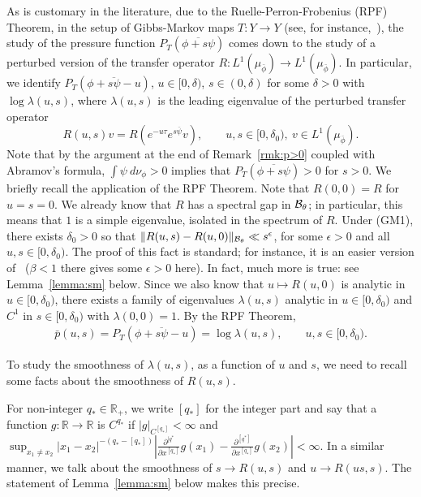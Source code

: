 \documentclass[12pt]{article}
\numberwithin{equation}{section}
\newcommand{\eps}{{\epsilon}}
\newcommand{\R}{\mathbb{R}}
\begin{document}
As is customary in the literature, due to the Ruelle-Perron-Frobenius (RPF) Theorem, in the setup of Gibbs-Markov maps $T:Y\to Y$ (see, for instance,~\cite[Section 3.3]{BruTerTod19}),  the study of
the pressure function $P_{T}(\overline{\phi+s\psi})$ comes down to the study of a perturbed version of the transfer operator $R:L^1(\mu_{\bar\phi})\to L^1(\mu_{\bar\phi})$. In particular, we identify $P_{T}(\overline{\phi+s\psi -u})$, $u\in [0,\delta)$, $s\in (0,\delta)$
for some $\delta>0$ with $\log\lambda(u,s)$, where $\lambda(u,s)$ is the leading eigenvalue
of the perturbed transfer operator 
\begin{equation*}
 R(u,s) v=R(e^{-u\tau} e^{s\overline{\psi}} v), \qquad u, s \in [0,\delta_0),\ v\in L^1(\mu_{\bar\phi}).
\end{equation*}
Note that by the argument at the end of Remark~\ref{rmk:p>0} coupled with Abramov's formula,  $\int\psi~d\nu_\phi>0$ implies that $P_T(\overline{\phi+s\psi})>0$ for $s>0$.
We briefly recall the application of the RPF Theorem.
Note that  $R(0,0)=R$ for $u=s=0$. We already know that $R$ has a spectral gap in $\mathcal{B}_\theta$; in particular, this means that $1$ is a simple eigenvalue, isolated in the spectrum of $R$.
Under (GM1), there exists $\delta_0>0$ so that $\|R(u,s)-R(u,0)\|_{\cB_\theta}\ll s^\eps$, for some
$\eps>0$ and all $u, s \in [0,\delta_0)$. The proof of this fact is standard; for instance, it is an easier version of~\cite[Proof of Lemma 5.2]{BruTerTod19} ($\beta<1$ there gives some $\eps>0$ here). In fact, much more is true: see Lemma~\ref{lemma:sm} below.
Since we also know that $u\mapsto R(u,0)$ is analytic in  $u\in [0,\delta_0)$, there exists
a family of eigenvalues $\lambda(u,s)$ analytic in $u\in [0,\delta_0)$ and $C^1$ in $s\in [0,\delta_0)$
with $\lambda(0,0)=1$. By the RPF Theorem,
\begin{align}\label{eq:presindev}
 \bar p(u,s)=P_{T}(\overline{\phi+s\psi -u})=\log\lambda(u,s), \qquad  u, s\in [0,\delta_0).
\end{align}

To study the smoothness of $\lambda(u,s)$, as a function of $u$ and $s$, we need to recall some facts about the smoothness
of $R(u,s)$.

For non-integer $q_{*}\in\R_{+}$, we write $[q_{*}]$ for the integer part and say that a function $g:\R\to \R$ is $C^{q_*}$ 
if $|g|_{C^{[q_{*}]}}<\infty$ and $\sup_{x_1\neq x_2} |x_1-x_2|^{-(q_{*}-[q_{*}])}|\frac{\partial^{[q^*}}{\partial x^{[q_*]}}g(x_1)-\frac{\partial^{[q^*]}}{\partial x^{[q_*]}}g(x_2)|<\infty$. In a similar manner, we talk about the smoothness of $s\to R(u,s)$
and $u\to R(us,s)$. The statement of Lemma~\ref{lemma:sm} below makes this precise.
\end{document}
